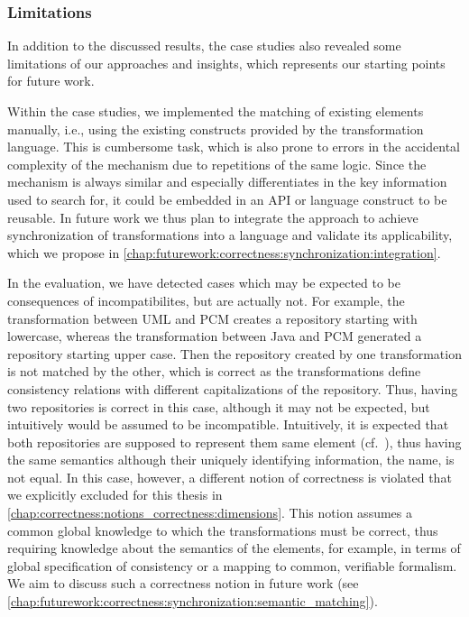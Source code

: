 \subsubsection{Limitations}

In addition to the discussed results, the case studies also revealed some limitations of our approaches and insights, which represents our starting points for future work.

Within the case studies, we implemented the matching of existing elements manually, i.e., using the existing constructs provided by the transformation language.
This is cumbersome task, which is also prone to errors in the accidental complexity of the mechanism due to repetitions of the same logic.
Since the mechanism is always similar and especially differentiates in the key information used to search for, it could be embedded in an API or language construct to be reusable.
In future work we thus plan to integrate the approach to achieve synchronization of transformations into a language and validate its applicability, which we propose in \autoref{chap:futurework:correctness:synchronization:integration}.

In the evaluation, we have detected cases which may be expected to be consequences of incompatibilites, but are actually not.
For example, the transformation between \gls{UML} and \gls{PCM} creates a repository starting with lowercase, whereas the transformation between Java and \gls{PCM} generated a repository starting upper case.
Then the repository created by one transformation is not matched by the other, which is correct as the transformations define consistency relations with different capitalizations of the repository.
Thus, having two repositories is correct in this case, although it may not be expected, but intuitively would be assumed to be incompatible.
Intuitively, it is expected that both repositories are supposed to represent them same element (cf.~\cite[Figure 6.4]{saglam2020ma}), thus having the same semantics although their uniquely identifying information, the name, is not equal.
In this case, however, a different notion of correctness is violated that we explicitly excluded for this thesis in \autoref{chap:correctness:notions_correctness:dimensions}.
This notion assumes a common global knowledge to which the transformations must be correct, thus requiring knowledge about the semantics of the elements, for example, in terms of global specification of consistency or a mapping to common, verifiable formalism.
We aim to discuss such a correctness notion in future work (see \autoref{chap:futurework:correctness:synchronization:semantic_matching}).

